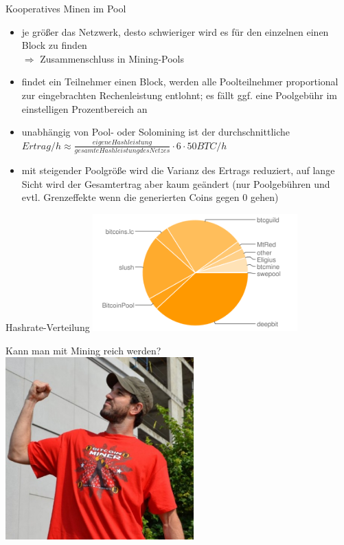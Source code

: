 \documentclass[handout]{beamer} \usepackage[german]{babel}
\begin{document}
\begin{frame}{Kooperatives Minen im Pool}
	\begin{itemize}
		\item je größer das Netzwerk, desto schwieriger wird es für den einzelnen
			einen Block zu finden \\
			$\Rightarrow$ Zusammenschluss in Mining-Pools
		\item findet ein Teilnehmer einen Block, werden alle Poolteilnehmer
			proportional zur eingebrachten Rechenleistung entlohnt; es fällt ggf.
			eine Poolgebühr im einstelligen Prozentbereich an
		\item unabhängig von Pool- oder Solomining ist der durchschnittliche 
			$Ertrag/h \approx \frac{eigene Hashleistung}{gesamte Hashleistung des
			Netzes}\cdot6\cdot50 BTC/h$
		\item mit steigender Poolgröße wird die Varianz des Ertrags reduziert,
			auf lange Sicht wird der Gesamtertrag aber kaum geändert (nur
			Poolgebühren und evtl. Grenzeffekte wenn die generierten Coins gegen 0
			gehen)
	\end{itemize}
\end{frame}

\begin{frame}{Hashrate-Verteilung}
\includegraphics[height=45mm]{btcvortrag/hashratedistribution.png}
\end{frame}

\begin{frame}{Kann man mit Mining reich werden?}
\includegraphics[height=70mm]{btcvortrag/MiningTshirt3.jpg}
\end{frame}
\end{document}
